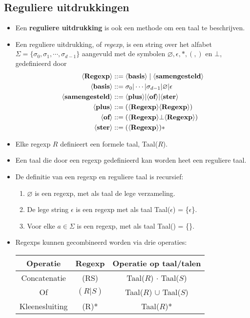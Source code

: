 \subsection{Reguliere uitdrukkingen}
\begin{itemize}
    \item Een \textbf{reguliere uitdrukking} is ook een methode om een taal te beschrijven.
    \item Een reguliere uitdrukking, of \textit{regexp}, is een string over het alfabet $\Sigma = \{\sigma_0, \sigma_1, \cdots, \sigma_{d-1}\}$ aangevuld met de symbolen $\varnothing, \epsilon, *, (, )$ en $\bot$, gedefinieerd door
    \begin{align*}
        \langle \textbf{Regexp} \rangle &::= \langle \textbf{basis} \rangle\;|\;\langle \textbf{samengesteld} \rangle \\
        \langle \textbf{basis} \rangle &::= \sigma_0|\cdots|\sigma_{d-1}|\varnothing|\epsilon \\
        \langle \textbf{samengesteld} \rangle &::= \langle \textbf{plus} \rangle|\langle \textbf{of} \rangle|\langle \textbf{ster} \rangle\\
        \langle \textbf{plus} \rangle &::= (\langle \textbf{Regexp} \rangle\langle \textbf{Regexp} \rangle)\\
        \langle \textbf{of} \rangle &::= (\langle \textbf{Regexp} \rangle\bot\langle \textbf{Regexp} \rangle)\\
        \langle \textbf{ster} \rangle &::= (\langle \textbf{Regexp} \rangle)*
    \end{align*}
    \item Elke regexp $R$ definieert een formele taal, Taal($R$).
    \item Een taal die door een regexp gedefinieerd kan worden heet een reguliere taal.
    \item De definitie van een regexp en reguliere taal is recursief:
    \begin{enumerate}
        \item $\varnothing$ is een regexp, met als taal de lege verzameling.
        \item De lege string $\epsilon$ is een regexp met als taal Taal($\epsilon$) = \{$\epsilon$\}.
        \item  Voor elke $a \in \Sigma$ is  een regexp, met als taal Taal() = \{\}.
    \end{enumerate}
    \item Regexps kunnen gecombineerd worden via drie operaties:

    \begin{table}[ht]
        \centering
        \begin{tabular}{c c c}
            \hline
            Operatie & Regexp & Operatie op taal/talen \\
            \hline
            Concatenatie & (RS) & Taal($R$) $\cdot$ Taal($S$) \\
            Of & $(R|S)$ & Taal($R$) $\cup$ Taal($S$) \\
            Kleenesluiting & (R)* & Taal($R$)* \\
            \hline
        \end{tabular}


\end{table}
\end{itemize}
